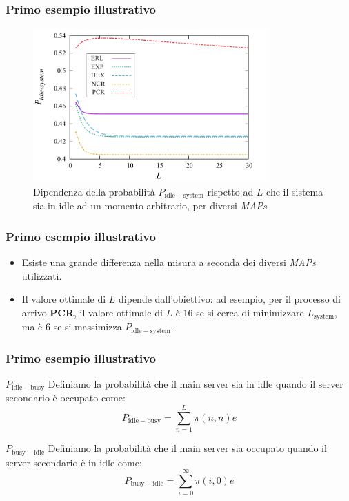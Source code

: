 \documentclass{beamer}
\begin{document}
\begin{frame}
    \frametitle{Primo esempio illustrativo}
    \begin{figure}[h]
        \centering
        \includegraphics[width=0.8\textwidth]{pSUZiNk.png}
        \caption{Dipendenza della probabilità $P_{\mathrm{idle-system}}$ rispetto ad $L$ che il sistema sia in idle ad un momento arbitrario, per diversi \emph{MAPs}}
        \label{fig:3}
    \end{figure}
\end{frame}


\begin{frame}
    \frametitle{Primo esempio illustrativo}
        \begin{itemize}
            \item Esiste una grande differenza nella misura a seconda dei diversi \emph{MAPs} utilizzati.
            \item Il valore ottimale di $L$ dipende dall'obiettivo: ad esempio, per il processo di arrivo \textbf{PCR}, il valore ottimale di $L$ è $16$ se si cerca di minimizzare $L_{\mathrm{system}}$, ma è 6 se si massimizza $P_{\mathrm{idle-system}}$.
        \end{itemize}
\end{frame}

\begin{frame}
    \frametitle{Primo esempio illustrativo}
    \begin{block}{$P_{\mathrm{idle-busy}}$}
        Definiamo la probabilità che il main server sia in idle quando il server secondario è occupato come:
        $$ P_{\mathrm{idle-busy}} = \sum_{n=1}^{L} \pi(n,n) e $$
    \end{block}
    \begin{block}{$P_{\mathrm{busy-idle}}$}
        Definiamo la probabilità che il main server sia occupato quando il server secondario è in idle come:
        $$ P_{\mathrm{busy-idle}} = \sum_{i=0}^{\infty} \pi(i,0) e $$
    \end{block}
\end{frame}
\end{document}
